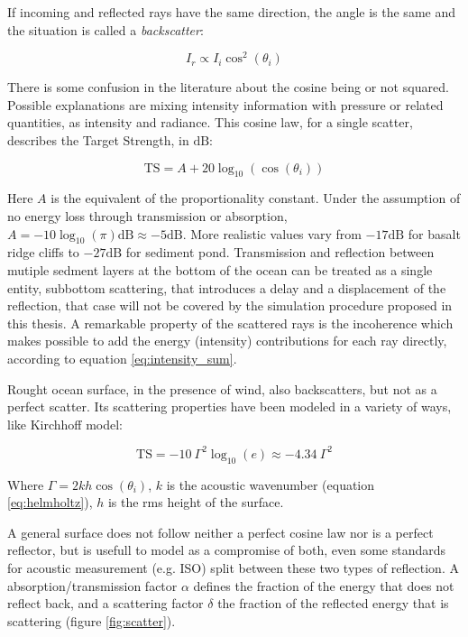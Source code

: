 If incoming and reflected rays have the same direction, the angle is the same
and the situation is called a \textit{backscatter}:

\begin{equation*}
I_r \propto I_i \cos^2(\theta_i)
\end{equation*}

There is some confusion in the literature about the cosine being or not
squared\cite{durany2015analytical,cox2006tutorial,cox2004acoustic,jones2009modelling,LURTON,Etter2013}.
Possible explanations are mixing intensity information with pressure
or related quantities, as intensity and radiance. This cosine law, for a single
scatter, describes the Target Strength, in $\text{dB}$:

\begin{equation*}
\text{TS} = A + 20\log_{10}(\cos(\theta_i))
\end{equation*}

Here $A$ is the equivalent of the proportionality constant. Under the assumption
of no energy loss through transmission or absorption,
$A=-10\log_{10}(\pi)\text{dB} \approx -5\text{dB}$. More realistic values vary
from $-17\text{dB}$ for basalt ridge cliffs to $-27\text{dB}$ for sediment
pond\cite{dunn2015springer}.
Transmission and reflection between mutiple sedment layers at the bottom of the
ocean can be treated as a single entity, subbottom scattering, that introduces a
delay and a displacement of the reflection\cite{Etter2013}, that case will not
be covered by the simulation procedure proposed in this thesis. A remarkable
property of the scattered rays is the incoherence which makes possible to add
the energy (intensity) contributions for each ray directly, according to
equation \ref{eq:intensity_sum}.

Rought ocean surface, in the presence of wind, also backscatters, but not as a
perfect scatter. Its scattering properties have been modeled in a variety of
ways\cite{jones2009modelling}, like Kirchhoff model\cite{dunn2015springer}:

\begin{equation*}
\text{TS} = -10~\Gamma^2\log_{10}(e) \approx -4.34~\Gamma^2
\end{equation*}

Where $\Gamma = 2kh\cos(\theta_i)$, $k$ is the acoustic wavenumber (equation
\ref{eq:helmholtz}), $h$ is the rms height of the surface.

A general surface does not follow neither a perfect cosine law nor is a perfect
reflector, but is usefull to model as a compromise of
both\cite{cox2006tutorial,vorlander2000definition}, even some standards for
acoustic measurement (e.g. ISO) split between these two types of
reflection\cite{rindel2001scattering}. A absorption/transmission factor $\alpha$
defines the fraction of the energy that does not reflect back, and a scattering
factor $\delta$ the fraction of the reflected energy that is scattering (figure
\ref{fig:scatter}).


